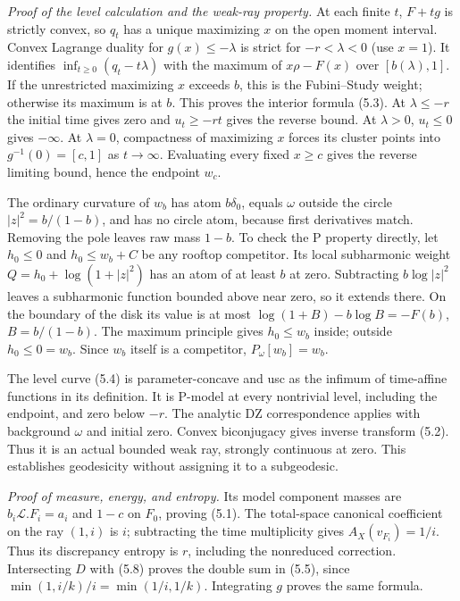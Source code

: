 \documentclass[
  11pt,
]{article}
\begin{document}
\emph{Proof of the level calculation and the weak-ray property.} At each
finite \(t\), \(F+tg\) is strictly convex, so \(q_t\) has a unique
maximizing \(x\) on the open moment interval. Convex Lagrange duality
for \(g(x)\leq-\lambda\) is strict for \(-r<\lambda<0\) (use \(x=1\)).
It identifies \(\inf_{t\geq0}(q_t-t\lambda)\) with the maximum of
\(x\rho-F(x)\) over \([b(\lambda),1]\). If the unrestricted maximizing
\(x\) exceeds \(b\), this is the Fubini--Study weight; otherwise its
maximum is at \(b\). This proves the interior formula (5.3). At
\(\lambda\leq-r\) the initial time gives zero and \(u_t\geq-rt\) gives
the reverse bound. At \(\lambda>0\), \(u_t\leq0\) gives \(-\infty\). At
\(\lambda=0\), compactness of maximizing \(x\) forces its cluster points
into \(g^{-1}(0)=[c,1]\) as \(t\to\infty\). Evaluating every fixed
\(x\geq c\) gives the reverse limiting bound, hence the endpoint
\(w_c\).

The ordinary curvature of \(w_b\) has atom \(b\delta_0\), equals
\(\omega\) outside the circle \(|z|^2=b/(1-b)\), and has no circle atom,
because first derivatives match. Removing the pole leaves raw mass
\(1-b\). To check the P property directly, let \(h_0\leq0\) and
\(h_0\leq w_b+C\) be any rooftop competitor. Its local subharmonic
weight \(Q=h_0+\log(1+|z|^2)\) has an atom of at least \(b\) at zero.
Subtracting \(b\log|z|^2\) leaves a subharmonic function bounded above
near zero, so it extends there. On the boundary of the disk its value is
at most \(\log(1+B)-b\log B=-F(b)\), \(B=b/(1-b)\). The maximum
principle gives \(h_0\leq w_b\) inside; outside \(h_0\leq0=w_b\). Since
\(w_b\) itself is a competitor, \(P_\omega[w_b]=w_b\).

The level curve (5.4) is parameter-concave and usc as the infimum of
time-affine functions in its definition. It is P-model at every
nontrivial level, including the endpoint, and zero below \(-r\). The
analytic DZ correspondence applies with background \(\omega\) and
initial zero. Convex biconjugacy gives inverse transform (5.2). Thus it
is an actual bounded weak ray, strongly continuous at zero. This
establishes geodesicity without assigning it to a subgeodesic.

\emph{Proof of measure, energy, and entropy.} Its model component masses
are \(b_i\mathcal L.F_i=a_i\) and \(1-c\) on \(F_0\), proving (5.1). The
total-space canonical coefficient on the ray \((1,i)\) is \(i\);
subtracting the time multiplicity gives \(A_X(v_{F_i})=1/i\). Thus its
discrepancy entropy is \(r\), including the nonreduced correction.
Intersecting \(D\) with (5.8) proves the double sum in (5.5), since
\(\min(1,i/k)/i=\min(1/i,1/k)\). Integrating \(g\) proves the same
formula.
\end{document}
